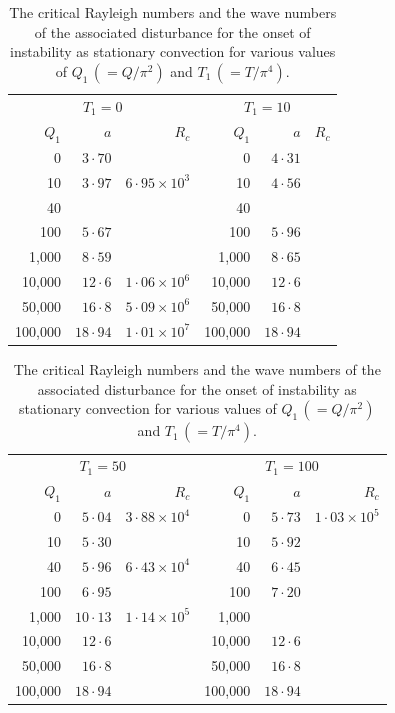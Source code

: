 \begin{table}[p]
\centering
\caption{The critical Rayleigh numbers and the wave numbers of the associated
disturbance for the onset of instability as stationary convection for various
values of $Q_1\,(= Q/\pi^{2})$ and $T_1\,(= T/\pi^{4})$.}
\label{tab:XVIII}

\medskip
\small
\begin{tabular}{r@{\quad}r@{\quad}r|r@{\quad}r@{\quad}r}
\hline
\multicolumn{3}{c|}{$T_1 = 0$} & \multicolumn{3}{c}{$T_1 = 10$} \\
$Q_1$ & $a$ & $R_c$ & $Q_1$ & $a$ & $R_c$ \\
\hline
 0     & $3{\cdot}70$  &           & 0     & $4{\cdot}31$  &           \\
 10    & $3{\cdot}97$  & $6{\cdot}95\times10^{3}$ & 10    & $4{\cdot}56$  &           \\
 40    &               &           & 40    &               &           \\
 100   & $5{\cdot}67$  &           & 100   & $5{\cdot}96$  &           \\
 1{,}000 & $8{\cdot}59$ &          & 1{,}000 & $8{\cdot}65$ &          \\
 10{,}000 & $12{\cdot}6$ &$1{\cdot}06\times10^{6}$& 10{,}000 & $12{\cdot}6$  & \\
 50{,}000 & $16{\cdot}8$ &$5{\cdot}09\times10^{6}$& 50{,}000 & $16{\cdot}8$  & \\
 100{,}000 & $18{\cdot}94$&$1{\cdot}01\times10^{7}$& 100{,}000 & $18{\cdot}94$ & \\
\hline
\end{tabular}

\bigskip
\begin{tabular}{r@{\quad}r@{\quad}r|r@{\quad}r@{\quad}r}
\hline
\multicolumn{3}{c|}{$T_1 = 50$} & \multicolumn{3}{c}{$T_1 = 100$} \\
$Q_1$ & $a$ & $R_c$ & $Q_1$ & $a$ & $R_c$ \\
\hline
 0    & $5{\cdot}04$  & $3{\cdot}88\times10^{4}$ & 0    & $5{\cdot}73$ &$1{\cdot}03\times10^{5}$\\
 10   & $5{\cdot}30$  &                          & 10   & $5{\cdot}92$ &           \\
 40   & $5{\cdot}96$  & $6{\cdot}43\times10^{4}$ & 40   & $6{\cdot}45$ &           \\
 100  & $6{\cdot}95$  &                          & 100  & $7{\cdot}20$ &           \\
 1{,}000 & $10{\cdot}13$ & $1{\cdot}14\times10^{5}$& 1{,}000 &             &           \\
 10{,}000 & $12{\cdot}6$ &                        & 10{,}000 & $12{\cdot}6$ &          \\
 50{,}000 & $16{\cdot}8$ &                        & 50{,}000 & $16{\cdot}8$ &          \\
 100{,}000 & $18{\cdot}94$ &                      & 100{,}000 & $18{\cdot}94$ &        \\
\hline
\end{tabular}


\end{table}
